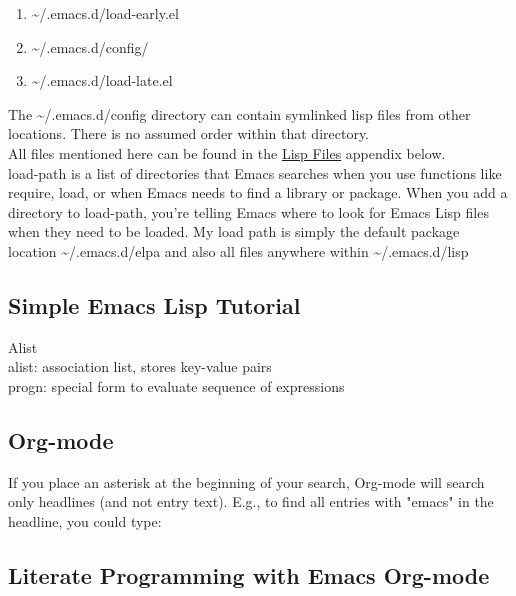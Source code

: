 \documentclass{article}
\begin{document}
\begin{enumerate}
\item \textasciitilde{}/.emacs.d/load-early.el\\[0pt]
\item \textasciitilde{}/.emacs.d/config/\\[0pt]
\item \textasciitilde{}/.emacs.d/load-late.el\\[0pt]
\end{enumerate}

The \textasciitilde{}/.emacs.d/config directory can contain symlinked lisp files from other locations. There is no assumed order within that directory.\\[0pt]

All files mentioned here can be found in the \hyperref[sec:orgf4a51a7]{Lisp Files} appendix below.\\[0pt]

load-path is a list of directories that Emacs searches when you use functions like require, load, or when Emacs needs to find a library or package. When you add a directory to load-path, you're telling Emacs where to look for Emacs Lisp files when they need to be loaded. My load path is simply the default package location \textasciitilde{}/.emacs.d/elpa and also all files anywhere within \textasciitilde{}/.emacs.d/lisp\\[0pt]
\subsection{Simple Emacs Lisp Tutorial}
\label{sec:org3e01cb4}
Alist\\[0pt]



alist: association list, stores key-value pairs\\[0pt]
progn: special form to evaluate sequence of expressions\\[0pt]
\subsection{Org-mode}
\label{sec:org1be77d2}

If you place an asterisk at the beginning of your search, Org-mode will search only headlines (and not entry text). E.g., to find all entries with "emacs" in the headline, you could type:\\[0pt]

\subsection{Literate Programming with Emacs Org-mode}
\label{sec:org3d8108a}
\end{document}
